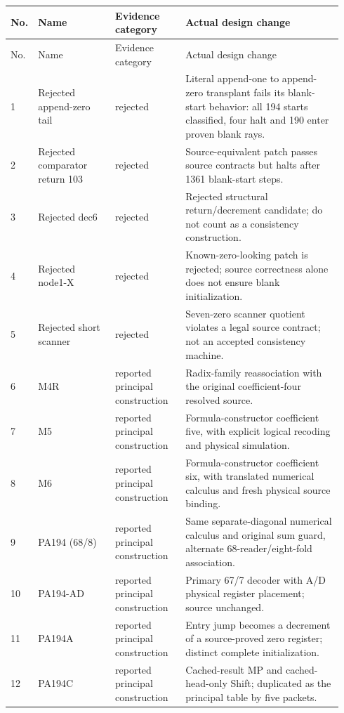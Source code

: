 \begingroup
\small
\setlength{\tabcolsep}{3pt}
\begin{longtable}{p{0.035\linewidth}p{0.23\linewidth}p{0.21\linewidth}p{0.47\linewidth}}
\toprule
No. & Name & Evidence category & Actual design change\\
\midrule
\endfirsthead
\toprule
No. & Name & Evidence category & Actual design change\\
\midrule
\endhead
1 & Rejected append-zero tail & rejected & Literal append-one to append-zero transplant fails its blank-start behavior: all 194 starts classified, four halt and 190 enter proven blank rays.\\[4pt]
2 & Rejected comparator return 103 & rejected & Source-equivalent patch passes source contracts but halts after 1361 blank-start steps.\\[4pt]
3 & Rejected dec6 & rejected & Rejected structural return/decrement candidate; do not count as a consistency construction.\\[4pt]
4 & Rejected node1-X & rejected & Known-zero-looking patch is rejected; source correctness alone does not ensure blank initialization.\\[4pt]
5 & Rejected short scanner & rejected & Seven-zero scanner quotient violates a legal source contract; not an accepted consistency machine.\\[4pt]
6 & M4R & reported principal construction & Radix-family reassociation with the original coefficient-four resolved source.\\[4pt]
7 & M5 & reported principal construction & Formula-constructor coefficient five, with explicit logical recoding and physical simulation.\\[4pt]
8 & M6 & reported principal construction & Formula-constructor coefficient six, with translated numerical calculus and fresh physical source binding.\\[4pt]
9 & PA194 (68/8) & reported principal construction & Same separate-diagonal numerical calculus and original sum guard, alternate 68-reader/eight-fold association.\\[4pt]
10 & PA194-AD & reported principal construction & Primary 67/7 decoder with A/D physical register placement; source unchanged.\\[4pt]
11 & PA194A & reported principal construction & Entry jump becomes a decrement of a source-proved zero register; distinct complete initialization.\\[4pt]
12 & PA194C & reported principal construction & Cached-result MP and cached-head-only Shift; duplicated as the principal table by five packets.\\[4pt]

\end{longtable}
